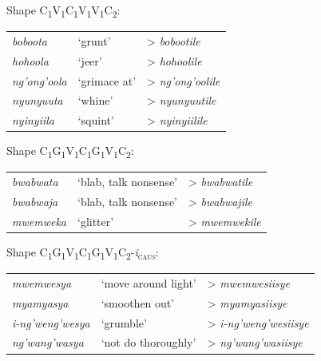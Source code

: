 \begin{exe}
\ex Shape C\textsubscript{1}V\textsubscript{1}C\textsubscript{1}V\textsubscript{1}V\textsubscript{1}C\textsubscript{2}:
\\\begin{tabular}[t]{@{}>{\itshape}lll}
\textit{boboota}&`grunt'& > \textit{bobootile}
\\\textit{hohoola}&`jeer'& > \textit{hohoolile}
\\\textit{ng'ong'oola}&`grimace at'& > \textit{ng'ong'oolile}
\\\textit{nyunyuuta}&`whine'& > \textit{nyunyuutile}
\\\textit{nyinyiila}&`squint'& > \textit{nyinyiilile}
\end{tabular}
\ex Shape C\textsubscript{1}G\textsubscript{1}V\textsubscript{1}C\textsubscript{1}G\textsubscript{1}V\textsubscript{1}C\textsubscript{2}:
\\\begin{tabular}[t]{@{}>{\itshape}lll}
\textit{bwabwata}&`blab, talk nonsense'& > \textit{bwabwatile}
\\\textit{bwabwaja}&`blab, talk nonsense'& > \textit{bwabwajile}
\\\textit{mwemweka}&`glitter'& > \textit{mwemwekile}
\end{tabular}
\ex Shape C\textsubscript{1}G\textsubscript{1}V\textsubscript{1}C\textsubscript{1}G\textsubscript{1}V\textsubscript{1}C\textsubscript{2}-\textit{i}\textsubscript{\textsc{caus}}:
\\\begin{tabular}[t]{@{}>{\itshape}lll}
\textit{mwemwesya}&`move around light'& > \textit{mwemwesiisye}
\\\textit{myamyasya}&`smoothen out'& > \textit{myamyasiisye}
\\\textit{i-ng'weng'wesya}&`grumble'& > \textit{i-ng'weng'wesiisye}
\\\textit{ng'wang'wasya}&`not do thoroughly'& > \textit{ng'wang'wasiisye}
\end{tabular}
\end{exe}

\label{PastNonPast}
